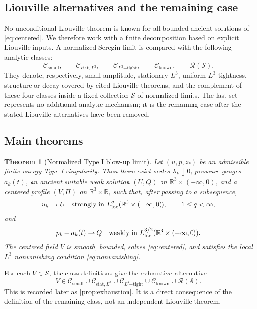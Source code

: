 \documentclass[11pt]{amsart}
\theoremstyle{plain}
\newtheorem{theorem}{Theorem}[section]
\theoremstyle{definition}
\theoremstyle{remark}
\numberwithin{equation}{section}
\newcommand{\R}{\mathbb R}
\newcommand{\loc}{\mathrm{loc}}
\newcommand{\calS}{\mathcal S}
\newcommand{\calR}{\mathcal R}
\newcommand{\calC}{\mathcal C}
\begin{document}
\subsection{Liouville alternatives and the remaining case}

No unconditional Liouville theorem is known for all bounded ancient solutions
of \eqref{eq:centered}.  We therefore work with a finite decomposition based
on explicit Liouville inputs.  A normalized Seregin limit is compared with the
following analytic classes:
\[
   \calC_{\mathrm{small}},\qquad
   \calC_{\mathrm{stat},L^3},\qquad
   \calC_{L^3\mathrm{-tight}},\qquad
   \calC_{\mathrm{known}},\qquad
   \calR(\calS).
\]
They denote, respectively, small amplitude, stationary \(L^3\), uniform
\(L^3\)-tightness, structure or decay covered by cited Liouville theorems, and
the complement of these four classes inside a fixed collection \(\calS\) of
normalized limits.  The last set represents no additional analytic mechanism;
it is the remaining case after the stated Liouville alternatives have been
removed.

\subsection{Main theorems}

\begin{theorem}[Normalized Type I blow-up limit]\label{thm:extraction}
Let \((u,p,z_*)\) be an admissible finite-energy Type I singularity.  Then
there exist scales \(\lambda_k\downarrow0\), pressure gauges \(a_k(t)\), an
ancient suitable weak solution \((U,Q)\) on
\(\R^3\times(-\infty,0)\), and a centered profile \((V,\Pi)\) on
\(\R^3\times\R\), such that, after passing to a subsequence,
\[
   u_k\to U
   \quad\hbox{strongly in }L^q_{\loc}(\R^3\times(-\infty,0)),
   \qquad 1\le q<\infty,
\]
and
\[
   p_k-a_k(t)\rightharpoonup Q
   \quad\hbox{weakly in }L^{3/2}_{\loc}(\R^3\times(-\infty,0)).
\]
The centered field \(V\) is smooth, bounded, solves \eqref{eq:centered}, and
satisfies the local \(L^3\) nonvanishing condition \eqref{eq:nonvanishing}.
\end{theorem}

For each \(V\in\calS\), the class definitions give the exhaustive alternative
\[
   V\in
   \calC_{\mathrm{small}}
   \cup
   \calC_{\mathrm{stat},L^3}
   \cup
   \calC_{L^3\mathrm{-tight}}
   \cup
   \calC_{\mathrm{known}}
   \cup
   \calR(\calS).
\]
This is recorded later as \cref{prop:exhaustion}.  It is a direct consequence
of the definition of the remaining class, not an independent Liouville theorem.
\end{document}
